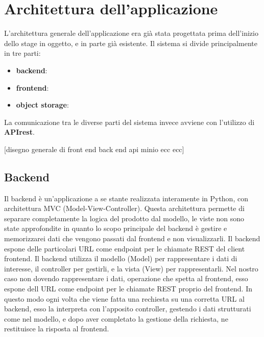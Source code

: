 \section{Architettura dell'applicazione}
L'architettura generale dell'applicazione era già stata progettata prima dell'inizio dello stage in oggetto, e in parte già esistente. Il sistema si divide principalmente in tre parti:
\begin{itemize}
  \item \textbf{backend}:
  \item \textbf{frontend}:
  \item \textbf{object storage}:
\end{itemize}

La comunicazione tra le diverse parti del sistema invece avviene con l'utilizzo di \textbf{APIrest}.

[disegno generale di front end back end api minio ecc ecc]
\subsection*{Backend}
Il backend è un'applicazione a se stante realizzata interamente in Python, con architettura MVC (Model-View-Controller). Questa architettura permette di separare completamente la logica del prodotto
dal modello, le viste non sono state approfondite in quanto lo scopo principale del backend è gestire e memorizzarei dati che vengono passati dal frontend e non visualizzarli. Il backend espone delle
particolari URL come endpoint per le chiamate REST del client frontend.
Il backend utilizza il modello (Model) per rappresentare i dati di interesse, il controller per gestirli, e la vista (View) per rappresentarli. Nel nostro caso non dovendo rappresentare i dati, operazione che spetta al frontend,
esso espone dell URL come endpoint per le chiamate REST proprio del frontend. In questo modo ogni volta che viene fatta una rechiesta su una corretta URL al backend, esso la interpreta con l'apposito controller, gestendo i dati strutturati come nel modello, e dopo aver
completato la gestione della richiesta, ne restituisce la risposta al frontend.
